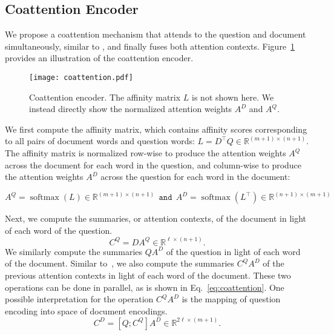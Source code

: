 \documentclass{article} \usepackage{iclr2017_conference,times}
\DeclareMathOperator*{\softmax}{softmax}
\newcommand{\dhid}{\ell}
\newcommand{\doclen}{m}
\newcommand{\queslen}{n}
\newcommand{\real}[1]{\mathbb{R}^{#1}}
\newcommand{\transpose}[1]{#1^{\top}}
\begin{document}
\subsection{Coattention Encoder}

We propose a coattention mechanism that attends to the question and document simultaneously, similar to \citep{lu2016hierarchical}, and finally fuses both attention contexts.
Figure~\ref{fig:encoder} provides an illustration of the coattention encoder.

\begin{figure}[!t]
    \centering
	\texttt{[image: coattention.pdf]}
    \vspace{-0.5cm}
	\caption{Coattention encoder. The affinity matrix $L$ is not shown here. We instead directly show the normalized attention weights $A^D$ and $A^Q$.}
	\label{fig:encoder}
\end{figure}

We first compute the affinity matrix, which contains affinity scores corresponding to all pairs of document words and question words:
$L = \transpose{D} Q \in \real{(m + 1) \times (n + 1)}$.
The affinity matrix is normalized row-wise to produce the attention weights $A^Q$ across the document for each word in the question, and column-wise to produce the attention weights $A^D$ across the question for each word in the document:

\begin{equation}
A^Q = \softmax \left( L \right) \in \real{(\doclen + 1) \times (\queslen + 1)} ~~\mathtt{and}~~
A^D = \softmax \left( \transpose{L} \right) \in \real{(\queslen + 1) \times (\doclen + 1)}
\end{equation}

Next, we compute the summaries, or attention contexts, of the document in light of each word of the question. 
\begin{equation}
C^Q = D A^Q \in \real{\dhid \times (\queslen + 1)}.
\end{equation}
We similarly compute the summaries $Q A^D$ of the question in light of each word of the document.
Similar to~\citet{cui2016attention}, we also compute the summaries $C^Q A^D$ of the previous attention contexts in light of each word of the document.
These two operations can be done in parallel, as is shown in Eq.~\ref{eq:coattention}.
One possible interpretation for the operation $C^Q A^D$ is the mapping of question encoding into space of document encodings.
\begin{equation}
\label{eq:coattention}
C^D = \left[ Q ; C^Q \right] A^D \in \real{2 \dhid \times (\doclen + 1)}.
\end{equation}
\end{document}
